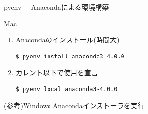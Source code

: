 \documentclass[12pt, dvipdfmx]{beamer}
\begin{document}
\begin{frame}[fragile]{pyenv + Anacondaによる環境構築}
    \begin{block}{Mac}
        \begin{enumerate}
            \item Anacondaのインストール(時間大)
\begin{lstlisting}[basicstyle=\small\ttfamily]
$ pyenv install anaconda3-4.0.0
\end{lstlisting}
            \item カレント以下で使用を宣言
\begin{lstlisting}[basicstyle=\small\ttfamily]
$ pyenv local anaconda3-4.0.0
\end{lstlisting}
        \end{enumerate}
    \end{block}
    \begin{exampleblock}{(参考)Windows}
        Anacondaインストーラを実行
    \end{exampleblock}
\end{frame}
\end{document}
